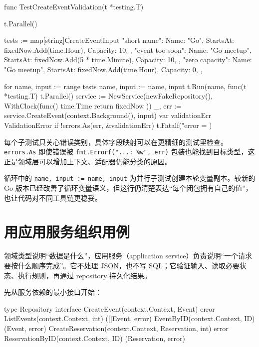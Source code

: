 \begin{gocode}[title={代码清单 12.15 \texttt{service\_test.go}：表驱动验证测试}]
func TestCreateEventValidation(t *testing.T) {
    t.Parallel()

    tests := map[string]CreateEventInput{
        "short name": {
            Name: "Go", StartsAt: fixedNow.Add(time.Hour), Capacity: 10,
        },
        "event too soon": {
            Name: "Go meetup",
            StartsAt: fixedNow.Add(5 * time.Minute), Capacity: 10,
        },
        "zero capacity": {
            Name: "Go meetup",
            StartsAt: fixedNow.Add(time.Hour), Capacity: 0,
        },
    }

    for name, input := range tests {
        name, input := name, input
        t.Run(name, func(t *testing.T) {
            t.Parallel()
            service := NewService(newFakeRepository(),
                WithClock(func() time.Time { return fixedNow }))
            _, err := service.CreateEvent(context.Background(), input)
            var validationErr ValidationError
            if !errors.As(err, &validationErr) {
                t.Fatalf("error = %
            }
        })
    }
}
\end{gocode}

每个子测试只关心错误类别，具体字段映射可以在更精细的测试里检查。\texttt{errors.As} 即使错误被 \texttt{fmt.Errorf("...: \%w", err)} 包装也能找到目标类型，这正是领域层可以增加上下文、适配器仍能分类的原因。

循环中的 \texttt{name, input := name, input} 为并行子测试创建本轮变量副本。较新的 Go 版本已经改善了循环变量语义，但这行仍清楚表达“每个闭包拥有自己的值”，也让代码对不同工具链更稳妥。

\section{用应用服务组织用例}

领域类型说明“数据是什么”，应用服务（application service）负责说明“一个请求要按什么顺序完成”。它不处理 JSON，也不写 SQL；它验证输入、读取必要状态、执行规则，再通过 repository 持久化结果。

先从服务依赖的最小接口开始：

\begin{gocode}[title={代码清单 12.16 \texttt{ports.go}：服务使用的 repository 接口}]
type Repository interface {
    CreateEvent(context.Context, Event) error
    ListEvents(context.Context, int) ([]Event, error)
    EventByID(context.Context, ID) (Event, error)
    CreateReservation(context.Context, Reservation, int) error
    ReservationByID(context.Context, ID) (Reservation, error)
}
\end{gocode}

